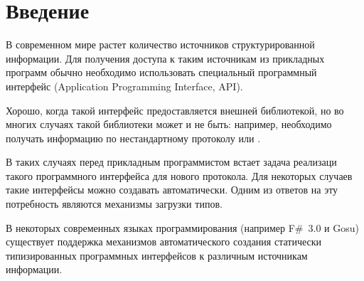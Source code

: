 \section{Введение}
\td
В современном мире растет количество источников структурированной информации. Для получения доступа к таким источникам из прикладных программ обычно необходимо использовать специальный программный интерфейс (Application Programming Interface, API).

Хорошо, когда такой интерфейс предоставляется внешней библиотекой, но во многих случаях такой библиотеки может и не быть: например, необходимо получать информацию по нестандартному протоколу или \td.

В таких случаях перед прикладным программистом встает задача реализаци такого программного интерфейса для нового протокола. Для некоторых случаев такие интерфейсы можно создавать автоматически. Одним из ответов на эту потребность являются механизмы загрузки типов. \td

В некоторых современных языках программирования (например F\#~3.0 и Gosu) существует поддержка механизмов автоматического создания статически типизированных программных интерфейсов к различным источникам информации.

